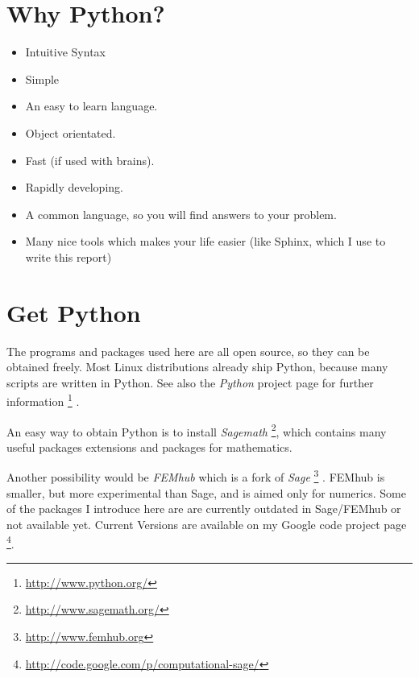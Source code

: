 \documentclass[letterpaper,10pt,english]{manual}
\begin{document}
\section{Why Python?}
\begin{itemize}
\item {} 
Intuitive Syntax

\item {} 
Simple

\item {} 
An easy to learn language.

\item {} 
Object orientated.

\item {} 
Fast (if used with brains).

\item {} 
Rapidly developing.

\item {} 
A common language, so you will find answers to your problem.

\item {} 
Many nice tools which makes your life easier (like Sphinx, which I use to write this report)

\end{itemize}


\section{Get Python}

The programs and packages used here are all open source, so they can be obtained freely.
Most Linux distributions already ship Python, because many scripts are written in Python.
See also the \emph{Python} project page for further information \footnote{
\href{http://www.python.org/}{http://www.python.org/}
} .

An easy way to obtain Python is to install \emph{Sagemath} \footnote{
\href{http://www.sagemath.org/}{http://www.sagemath.org/}
}, which contains many useful packages extensions
and packages for mathematics.

Another possibility would be \emph{FEMhub} which is a fork of \emph{Sage} \footnote{
\href{http://www.femhub.org}{http://www.femhub.org}
} . FEMhub is smaller, but more experimental than
Sage, and is aimed only for numerics.
Some of the packages I introduce here are are currently outdated in Sage/FEMhub or not available yet. Current Versions are
available on my Google code project page \footnote{
\href{http://code.google.com/p/computational-sage/}{http://code.google.com/p/computational-sage/}
}.
\end{document}
